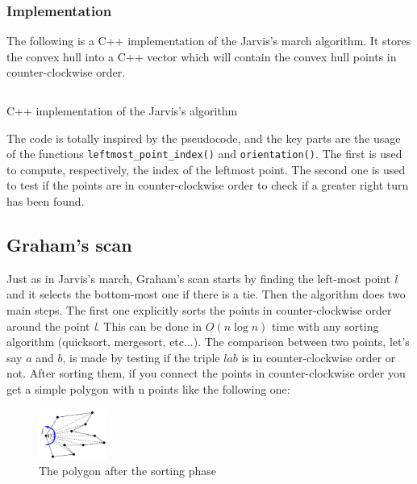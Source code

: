 \documentclass{article}
\begin{document}
\subsubsection*{Implementation}

The following is a C++ implementation of the Jarvis's march algorithm. It stores the convex hull into a C++ vector which will contain the convex hull points in counter-clockwise order. 

\begin{listing}[H]
    \inputminted{cpp}{code/jarvismarch.cpp}
    \caption{C++ implementation of the Jarvis's algorithm}
\end{listing}

The code is totally inspired by the pseudocode, and the key parts are the usage of the functions \texttt{leftmost_point_index()} and \texttt{orientation()}. The first is used to compute, respectively, the index of the leftmost point. The second one is used to test if the points are in counter-clockwise order to check if a greater right turn has been found.

\newpage
\subsection{Graham's scan}

Just as in Jarvis's march, Graham's scan starts by finding the left-most point \textit{l} and it selects the bottom-most one if there is a tie. Then the algorithm does two main steps. The first one explicitly sorts the points in counter-clockwise order around the point \textit{l}. This can be done in $O(n\log{n})$ time with any sorting algorithm (quicksort, mergesort, etc...). The comparison between two points, let's say $a$ and $b$, is made by testing if the triple $lab$ is in counter-clockwise order or not. After sorting them, if you connect the points in counter-clockwise order you get a simple polygon with n points like the following one:

\begin{figure}[h]
\centering
\includegraphics[width=0.2\textwidth]{graham/graham_visual_sorting.PNG}
\caption{\label{fig:graham_visual_sorting}The polygon after the sorting phase \cite{jeffe}}
\end{figure}
\end{document}
